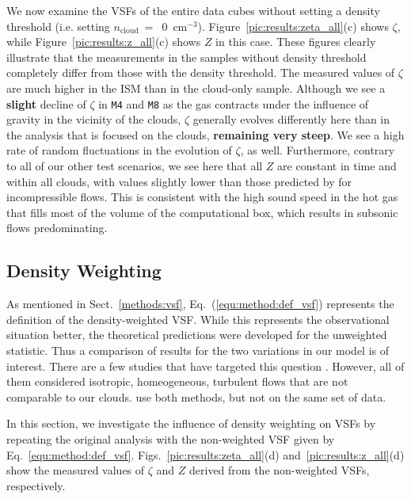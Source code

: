 We now examine the VSFs of the entire data cubes without setting a density threshold (i.e. setting $n_\mathrm{cloud}~=$~0~cm$^{-3}$).  Figure~\ref{pic:results:zeta_all}(c) shows $\zeta$, while Figure~\ref{pic:results:z_all}(c) shows $Z$ in this case.
These figures clearly illustrate that the measurements in the samples without density threshold completely differ from those with the density threshold.
The measured values of $\zeta$ are much higher in the ISM than in the cloud-only sample.
Although we see a \textbf{slight} decline of $\zeta$ in \texttt{M4} and \texttt{M8} as the gas contracts under the influence of gravity in the vicinity of the clouds, $\zeta$ generally evolves differently here than in the analysis that is focused on the clouds, \textbf{remaining very steep}.
We see a high rate of random fluctuations in the evolution of $\zeta$, as well.
Furthermore, contrary to all of our other test scenarios, we see here that all $Z$ are constant in time and within all clouds, with values slightly lower than those predicted by \citet{She1994} for incompressible flows.  
This is consistent with the high sound speed in the hot gas that fills most of the volume of the computational box, which results in subsonic flows predominating.


\subsection{Density Weighting}\label{results:densweight}

As mentioned in Sect.~\ref{methods:vsf}, Eq.~(\ref{equ:method:def_vsf}) represents the definition of the density-weighted VSF.
While this represents the observational situation better, the theoretical predictions were developed for the unweighted statistic.  Thus a comparison of results for the two variations in our model is of interest.
There are a few studies that have targeted this question 
\citep[e.g.,][]{Benzi1993,Schmidt2008, Benzi2010,Gotoh2002}.  
However, all of them considered isotropic, homeogeneous, turbulent flows that are not comparable to our clouds.
\citet{Padoan2016a} use both methods, but not on the same set of data. 

In this section, we investigate the influence of density weighting on VSFs by repeating the original analysis with the non-weighted VSF given by Eq.~\ref{equ:method:def_vsf}.
Figs.~\ref{pic:results:zeta_all}(d) and~\ref{pic:results:z_all}(d) show the measured values of $\zeta$ and $Z$ derived from the non-weighted VSFs, respectively.

